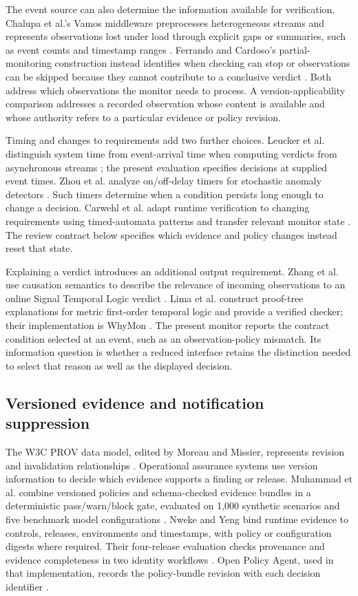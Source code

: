 \documentclass[preprint,11pt]{elsarticle}
\begin{document}
The event source can also determine the information available for verification. Chalupa et al.'s Vamos middleware preprocesses heterogeneous streams and represents observations lost under load through explicit gaps or summaries, such as event counts and timestamp ranges \cite{chalupa2025vamos}. Ferrando and Cardoso's partial-monitoring construction instead identifies when checking can stop or observations can be skipped because they cannot contribute to a conclusive verdict \cite{ferrando2025partial}. Both address which observations the monitor needs to process. A version-applicability comparison addresses a recorded observation whose content is available and whose authority refers to a particular evidence or policy revision.

Timing and changes to requirements add two further choices. Leucker et al. distinguish system time from event-arrival time when computing verdicts from asynchronous streams \cite{leucker2020streams}; the present evaluation specifies decisions at supplied event times. Zhou et al. analyze on/off-delay timers for stochastic anomaly detectors \cite{zhou2025delay}. Such timers determine when a condition persists long enough to change a decision. Carwehl et al. adapt runtime verification to changing requirements using timed-automata patterns and transfer relevant monitor state \cite{carwehl2023changing}. The review contract below specifies which evidence and policy changes instead reset that state.

Explaining a verdict introduces an additional output requirement. Zhang et al. use causation semantics to describe the relevance of incoming observations to an online Signal Temporal Logic verdict \cite{zhang2026caumon}. Lima et al. construct proof-tree explanations for metric first-order temporal logic and provide a verified checker; their implementation is WhyMon \cite{lima2024explainable}. The present monitor reports the contract condition selected at an event, such as an observation-policy mismatch. Its information question is whether a reduced interface retains the distinction needed to select that reason as well as the displayed decision.

\subsection{Versioned evidence and notification suppression}
The W3C PROV data model, edited by Moreau and Missier, represents revision and invalidation relationships \cite{moreau2013prov}. Operational assurance systems use version information to decide which evidence supports a finding or release. Muhammad et al. combine versioned policies and schema-checked evidence bundles in a deterministic pass/warn/block gate, evaluated on 1,000 synthetic scenarios and five benchmark model configurations \cite{muhammad2026audit}. Nweke and Yeng bind runtime evidence to controls, releases, environments and timestamps, with policy or configuration digests where required. Their four-release evaluation checks provenance and evidence completeness in two identity workflows \cite{nwekeyeng2026compliance}. Open Policy Agent, used in that implementation, records the policy-bundle revision with each decision identifier \cite{opa2026logs}.
\end{document}
